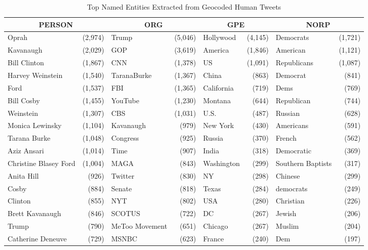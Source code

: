 \documentclass[manuscript,screen,nonacm,11pt,acm]{acmart}
\begin{document}
\begin{bibunit}
\begin{table}
	\centering
	\caption{Top Named Entities Extracted from Geocoded Human Tweets}
	\label{tab:ner_results}
	\small
	\begin{adjustbox}{max width=\textwidth}
		\begin{tabular}{@{}lr|lr|lr|lr@{}}
			\toprule
			\multicolumn{2}{c}{\textbf{PERSON}} & \multicolumn{2}{c}{\textbf{ORG}} & \multicolumn{2}{c}{\textbf{GPE}} & \multicolumn{2}{c}{\textbf{NORP}} \\
			\midrule
			Oprah & (2,974) & Trump & (5,046) & Hollywood & (4,145) & Democrats & (1,721) \\
			Kavanaugh & (2,029) & GOP & (3,619) & America & (1,846) & American & (1,121) \\
			Bill Clinton & (1,867) & CNN & (1,378) & US & (1,091) & Republicans & (1,087) \\
			Harvey Weinstein & (1,540) & TaranaBurke & (1,367) & China & (863) & Democrat & (841) \\
			Ford & (1,537) & FBI & (1,365) & California & (719) & Dems & (769) \\
			Bill Cosby & (1,455) & YouTube & (1,230) & Montana & (644) & Republican & (744) \\
			Weinstein & (1,307) & CBS & (1,031) & U.S. & (487) & Russian & (628) \\
			Monica Lewinsky & (1,104) & Kavanaugh & (979) & New York & (430) & Americans & (591) \\
			Tarana Burke & (1,048) & Congress & (925) & Russia & (370) & French & (562) \\
			Aziz Ansari & (1,014) & Time & (907) & India & (318) & Democratic & (369) \\
			Christine Blasey Ford & (1,004) & MAGA & (843) & Washington & (299) & Southern Baptists & (317) \\
			Anita Hill & (926) & Twitter & (830) & NY & (298) & Chinese & (299) \\
			Cosby & (884) & Senate & (818) & Texas & (284) & democrats & (249) \\
			Clinton & (855) & NYT & (802) & USA & (280) & Christian & (226) \\
			Brett Kavanaugh & (846) & SCOTUS & (722) & DC & (267) & Jewish & (206) \\
			Trump & (790) & MeToo Movement & (651) & Chicago & (267) & Muslim & (204) \\
			Catherine Deneuve & (729) & MSNBC & (623) & France & (240) & Dem & (197) \\

\end{tabular}
\end{adjustbox}
\end{table}
\end{bibunit}
\end{document}
